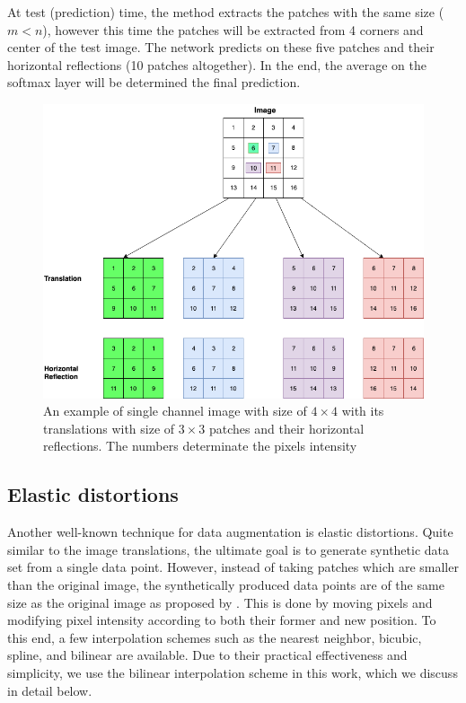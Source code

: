 At test (prediction) time, the method extracts the patches with the same size ($m < n$), however this time the
patches will be extracted from 4 corners and center of the test image. The network predicts on these
five patches and their horizontal reflections (10 patches altogether). In the end, the average
on the softmax layer will be determined the final prediction.

\begin{figure}
  \centering
  \label{fig:label-preserving-trasformation}
  \includegraphics[width=1\textwidth]{fig/label-preserving-transformation}
  \caption{An example of single channel image with size of $4\times4$ with its translations with size of $3\times3$ patches and their horizontal reflections. The numbers determinate the pixels intensity}
\end{figure}


\subsection{Elastic distortions}
\label{tit:elastic-distrotion}
Another well-known technique for data augmentation is elastic distortions. Quite similar to the image
translations, the ultimate goal is to generate synthetic data set from a single data point. However, instead of
taking patches which are smaller than the original image, the synthetically produced data points are
of the same size as the original image as proposed by \cite{elastic_distortion_paper} . This is done by moving pixels and modifying pixel intensity
according to both their former and new position.  To this end, a few interpolation schemes such as
the nearest neighbor, bicubic, spline, and bilinear are available. Due to their practical
effectiveness and simplicity, we use the bilinear interpolation scheme in this work, which we
discuss in detail below.

